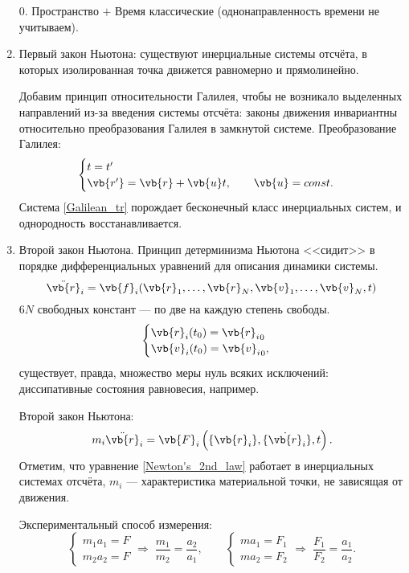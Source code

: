 \begin{enumerate}
\item[0.] Пространство $+$ Время классические (однонаправленность времени не учитываем).
\item Первый закон Ньютона:  существуют инерциальные системы отсчёта, в которых изолированная точка движется равномерно и прямолинейно.

Добавим принцип относительности Галилея, чтобы не возникало выделенных направлений из-за введения системы отсчёта: законы движения инвариантны относительно преобразования Галилея в замкнутой системе. Преобразование Галилея:
\begin{equation}
\begin{cases}
t = t'\\
\vb{r'} = \vb{r} + \vb{u}t, \qquad \vb{u} = const.
\end{cases}
\label{Galilean_tr}
\end{equation}
Система \eqref{Galilean_tr} порождает бесконечный класс инерциальных систем, и однородность восстанавливается.

\item Второй закон Ньютона.  Принцип детерминизма Ньютона <<сидит>> в порядке дифференциальных уравнений для описания динамики системы.
\begin{equation*}
\Ddot{\vb{r}}_i = \vb{f}_i (\vb{r}_1, \dots, \vb{r}_N, \vb{v}_1, \dots, \vb{v}_N, t) 
\end{equation*}
$6N$ свободных констант --- по две на каждую степень свободы.
\begin{equation*}
\begin{cases}
\vb{r}_i (t_0) = {\vb{r}_i}_0\\
\vb{v}_i (t_0) = {\vb{v}_i}_0,
\end{cases}
\end{equation*}
существует, правда, множество меры нуль всяких исключений: диссипативные состояния равновесия, например.

Второй закон Ньютона:
\begin{equation}
m_i \ddot{\vb{r}}_i = \vb{F}_i \left(\{\vb{r}_i\}, \{\dot{\vb{r}}_i\}, t\right).
\label{Newton's_2nd_law}
\end{equation}
Отметим, что уравнение \eqref{Newton's_2nd_law} работает в инерциальных системах отсчёта, $m_i$ --- характеристика материальной точки, не зависящая от движения.

Экспериментальный способ измерения:
\begin{equation*}
\begin{cases}
m_1 a_1 = F\\
m_2 a_2 = F
\end{cases}
\Rightarrow \; \frac{m_1}{m_2} = \frac{a_2}{a_1}, \qquad
\begin{cases}
ma_1 = F_1\\
ma_2 = F_2
\end{cases}
\Rightarrow \; \frac{F_1}{F_2} = \frac{a_1}{a_2}.
\end{equation*}

\end{enumerate}
